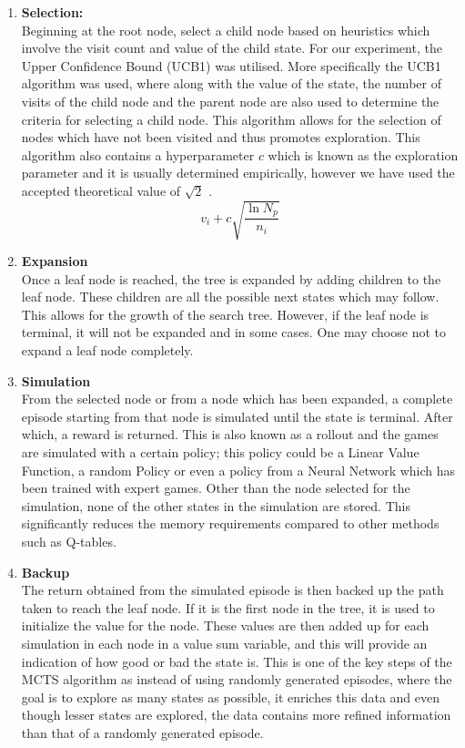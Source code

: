 \documentclass[a4paper,12pt,table]{article}
\begin{document}
\begin{enumerate}
    \item \textbf{Selection:} \\
    Beginning at the root node, select a child node based on heuristics which involve the visit count and value of the child state. For our experiment, the Upper Confidence Bound (UCB1) was utilised. More specifically the UCB1 algorithm was used, where along with the value of the state, the number of visits of the child node and the parent node are also used to determine the criteria for selecting a child node. This algorithm allows for the selection of nodes which have not been visited and thus promotes exploration. This algorithm also contains a hyperparameter $c$ which is known as the exploration parameter and it is usually determined empirically, however we have used the accepted theoretical value of $\sqrt{2}$ \cite{Reinforcement learning: An introduction}.
    \[v_i + c\sqrt{\frac{\ln{N_p}}{n_i}}  \]
    
    \item \textbf{Expansion} \\
    Once a leaf node is reached, the tree is expanded by adding children to the leaf node. These children are all the possible next states which may follow. This allows for the growth of the search tree. However, if the leaf node is terminal, it will not be expanded and in some cases. One may choose not to expand a leaf node completely.
    
    \item \textbf{Simulation} \\
    From the selected node or from a node which has been expanded, a complete episode starting from that node is simulated until the state is terminal. After which, a reward is returned. This is also known as a rollout and the games are simulated with a certain policy; this policy could be a Linear Value Function, a random Policy or even a policy from a Neural Network which has been trained with expert games. Other than the node selected for the simulation, none of the other states in the simulation are stored. This significantly reduces the memory requirements compared to other methods such as Q-tables.
    
    \item \textbf{Backup} \\
    The return obtained from the simulated episode is then backed up the path taken to reach the leaf node. If it is the first node in the tree, it is used to initialize the value for the node. These values are then added up for each simulation in each node in a value sum variable, and this will provide an indication of how good or bad the state is. This is one of the key steps of the MCTS algorithm as instead of using randomly generated episodes, where the goal is to explore as many states as possible, it enriches this data and even though lesser states are explored, the data contains more refined information than that of a randomly generated episode.
\end{enumerate}
\end{document}
